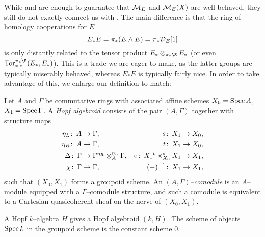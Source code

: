 While {\CH} and {\FH} are enough to guarantee that $\mathcal{M}_{E}$ and $\mathcal{M}_{E}(X)$ are well-behaved, they still do not exactly connect us with .  The main difference is that the ring of homology cooperations for $E$ \[E_*E = \pi_*(E \wedge E) = \pi_* \mathcal D_E[1]\] is only distantly related to the tensor product $E_* \otimes_{\pi_* \S} E_*$ (or even $\Tor^{\pi_* \S}_{*, *}(E_*, E_*)$).  This is a trade we are eager to make, as the latter groups are typically miserably behaved, whereas $E_* E$ is typically fairly nice.  In order to take advantage of this, we enlarge our definition to match:

\begin{definition}\label{FHGivesComodules}
Let $A$ and $\Gamma$ be commutative rings with associated affine schemes $X_0 = \operatorname{Spec} A$, $X_1 = \operatorname{Spec} \Gamma$.  A \textit{Hopf algebroid} consists of the pair $(A, \Gamma)$ together with structure maps
\begin{align*}
\eta_L \colon\thinspace A & \to \Gamma, & s\colon\thinspace X_1 & \to X_0, \\
\eta_R \colon\thinspace A & \to \Gamma, & t\colon\thinspace X_1 & \to X_0, \\
\Delta \colon\thinspace \Gamma & \to \Gamma {}^{\eta_R} \otimes_A^{\eta_L} \Gamma, & \circ\colon\thinspace X_1 {}^{t}\times_{X_0}^{s} X_1 & \to X_1, \\
\chi \colon\thinspace \Gamma & \to \Gamma, & (-)^{-1}\colon\thinspace X_1 & \to X_1,
\end{align*}
such that $(X_0, X_1)$ forms a groupoid scheme.  An \textit{$(A, \Gamma)$--comodule} is an $A$--module equipped with a $\Gamma$--comodule structure, and such a comodule is equivalent to a Cartesian quasicoherent sheaf on the nerve of $(X_0, X_1)$.
\end{definition}

\begin{example}
A Hopf $k$--algebra $H$ gives a Hopf algebroid $(k, H)$.  The scheme of objects $\operatorname{Spec} k$ in the groupoid scheme is the constant scheme $0$.
\end{example}

